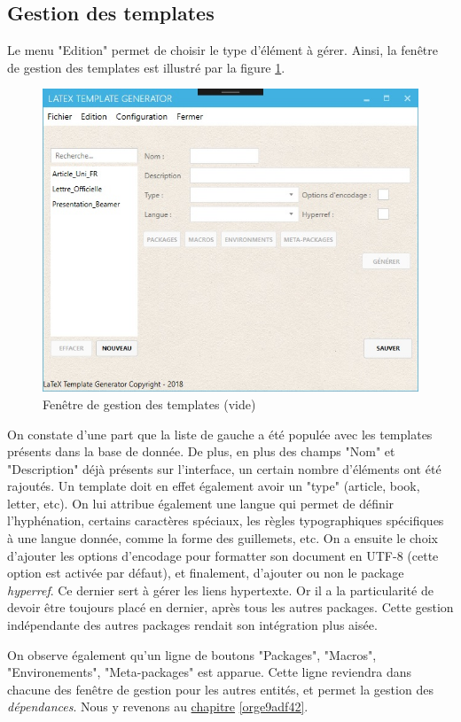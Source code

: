 \documentclass[a4paper, oneside]{article}
\begin{document}
\subsection{Gestion des templates}
\label{sec:org714228c}
Le menu "Edition" permet de choisir le type d'élément à gérer. Ainsi, la fenêtre
de gestion des templates est illustré par la figure \ref{fig:org0beb42d}.
\begin{figure}[htbp]
\centering
\includegraphics[width=.9\linewidth]{../Images/template_vide.jpg}
\caption{\label{fig:org0beb42d}
Fenêtre de gestion des templates (vide)}
\end{figure}

On constate d'une part que la liste de gauche a été populée avec les templates
présents dans la base de donnée. De plus, en plus des champs "Nom" et
"Description" déjà présents sur l'interface, un certain nombre d'éléments ont
été rajoutés. Un template doit en effet également avoir un "type" (article,
book, letter, etc). On lui attribue également une langue qui permet de définir
l'hyphénation, certains caractères spéciaux, les règles typographiques
spécifiques à une langue donnée, comme la forme des guillemets, etc. On a
ensuite le choix d'ajouter les options d'encodage pour formatter son document en
UTF-8 (cette option est activée par défaut), et finalement, d'ajouter ou non le
package \emph{hyperref}. Ce dernier sert à gérer les liens hypertexte. Or il a la
particularité de devoir être toujours placé en dernier, après tous les autres
packages. Cette gestion indépendante des autres packages rendait son intégration
plus aisée.

On observe également qu'un ligne de boutons "Packages", "Macros",
"Environements", "Meta-packages" est apparue. Cette ligne reviendra dans chacune
des fenêtre de gestion pour les autres entités, et permet la gestion des
\emph{dépendances}. Nous y revenons au \hyperref[orge9adf42]{chapitre} \ref{orge9adf42}.
\end{document}
